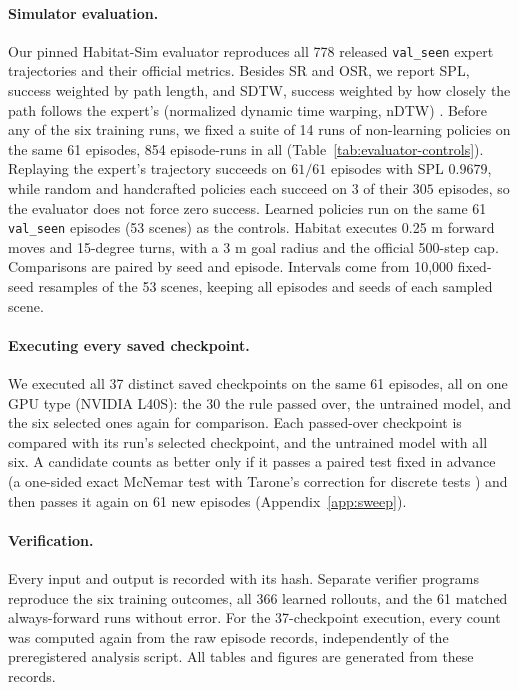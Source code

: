 \paragraph{Simulator evaluation.}
Our pinned Habitat-Sim evaluator \citep{savva2019habitat} reproduces all 778 released
\texttt{val\_seen} expert trajectories and their official metrics. Besides SR and OSR, we report SPL,
success weighted by path length, and SDTW, success weighted by how closely the path follows the
expert's (normalized dynamic time warping, nDTW) \citep{ilharco2019general}. Before any of the six
training runs, we fixed a suite of 14 runs of non-learning policies on the same 61 episodes, 854 episode-runs
in all (Table~\ref{tab:evaluator-controls}). Replaying the expert's trajectory succeeds on $61/61$
episodes with SPL $0.9679$, while random and handcrafted policies each succeed on $3$ of their $305$
episodes, so the evaluator does not force zero success. Learned policies run on the same 61
\texttt{val\_seen} episodes (53 scenes) as the controls. Habitat executes 0.25 m forward moves and
15-degree turns, with a 3 m goal radius and the official 500-step cap. Comparisons are paired
by seed and episode. Intervals come from 10,000 fixed-seed resamples of the 53 scenes, keeping all
episodes and seeds of each sampled scene.

\paragraph{Executing every saved checkpoint.}
We executed all 37 distinct saved checkpoints on the same 61 episodes, all on one GPU type (NVIDIA
L40S): the 30 the rule passed over, the untrained model, and the six selected ones again for
comparison. Each passed-over checkpoint is compared with its run's selected checkpoint, and the
untrained model with all six. A candidate counts as better only if it passes a paired test fixed in
advance (a one-sided exact McNemar test with Tarone's correction for discrete tests
\citep{tarone1990modified}) and then passes it again on 61 new episodes
(Appendix~\ref{app:sweep}).

\paragraph{Verification.}
Every input and output is recorded with its hash. Separate verifier programs reproduce the six training
outcomes, all 366 learned rollouts, and the 61 matched always-forward runs without error. For the
37-checkpoint execution, every count was computed again from the raw episode records, independently
of the preregistered analysis script. All tables and figures are generated from these records.

